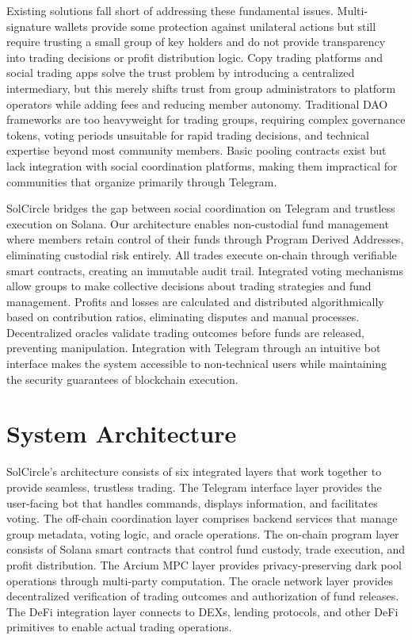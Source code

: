 \documentclass[11pt,a4paper]{article}
\begin{document}
Existing solutions fall short of addressing these fundamental issues. Multi-signature wallets provide some protection against unilateral actions but still require trusting a small group of key holders and do not provide transparency into trading decisions or profit distribution logic. Copy trading platforms and social trading apps solve the trust problem by introducing a centralized intermediary, but this merely shifts trust from group administrators to platform operators while adding fees and reducing member autonomy. Traditional DAO frameworks are too heavyweight for trading groups, requiring complex governance tokens, voting periods unsuitable for rapid trading decisions, and technical expertise beyond most community members. Basic pooling contracts exist but lack integration with social coordination platforms, making them impractical for communities that organize primarily through Telegram.

SolCircle bridges the gap between social coordination on Telegram and trustless execution on Solana. Our architecture enables non-custodial fund management where members retain control of their funds through Program Derived Addresses, eliminating custodial risk entirely. All trades execute on-chain through verifiable smart contracts, creating an immutable audit trail. Integrated voting mechanisms allow groups to make collective decisions about trading strategies and fund management. Profits and losses are calculated and distributed algorithmically based on contribution ratios, eliminating disputes and manual processes. Decentralized oracles validate trading outcomes before funds are released, preventing manipulation. Integration with Telegram through an intuitive bot interface makes the system accessible to non-technical users while maintaining the security guarantees of blockchain execution.

\section{System Architecture}

SolCircle's architecture consists of six integrated layers that work together to provide seamless, trustless trading. The Telegram interface layer provides the user-facing bot that handles commands, displays information, and facilitates voting. The off-chain coordination layer comprises backend services that manage group metadata, voting logic, and oracle operations. The on-chain program layer consists of Solana smart contracts that control fund custody, trade execution, and profit distribution. The Arcium MPC layer provides privacy-preserving dark pool operations through multi-party computation. The oracle network layer provides decentralized verification of trading outcomes and authorization of fund releases. The DeFi integration layer connects to DEXs, lending protocols, and other DeFi primitives to enable actual trading operations.
\end{document}
